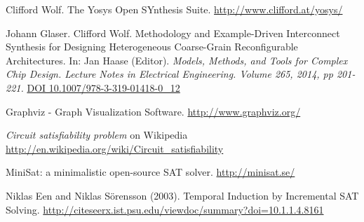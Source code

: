 \documentclass[9pt,technote,a4paper]{IEEEtran}
\begin{document}
\begin{thebibliography}{9}

Clifford Wolf. The Yosys Open SYnthesis Suite.
\url{http://www.clifford.at/yosys/}

Johann Glaser. Clifford Wolf. Methodology and Example-Driven Interconnect
Synthesis for Designing Heterogeneous Coarse-Grain Reconfigurable
Architectures. In: Jan Haase (Editor). {\it Models, Methods, and Tools for Complex Chip Design.
Lecture Notes in Electrical Engineering. Volume 265, 2014, pp 201-221.\/}
\href{http://dx.doi.org/10.1007/978-3-319-01418-0_12}{DOI 10.1007/978-3-319-01418-0\_12}

Graphviz - Graph Visualization Software.
\url{http://www.graphviz.org/}

{\it Circuit satisfiability problem} on Wikipedia
\url{http://en.wikipedia.org/wiki/Circuit_satisfiability}

MiniSat: a minimalistic open-source SAT solver.
\url{http://minisat.se/}

Niklas Een and Niklas Sörensson (2003).
Temporal Induction by Incremental SAT Solving.
\url{http://citeseerx.ist.psu.edu/viewdoc/summary?doi=10.1.1.4.8161}

\end{thebibliography}
\end{document}
